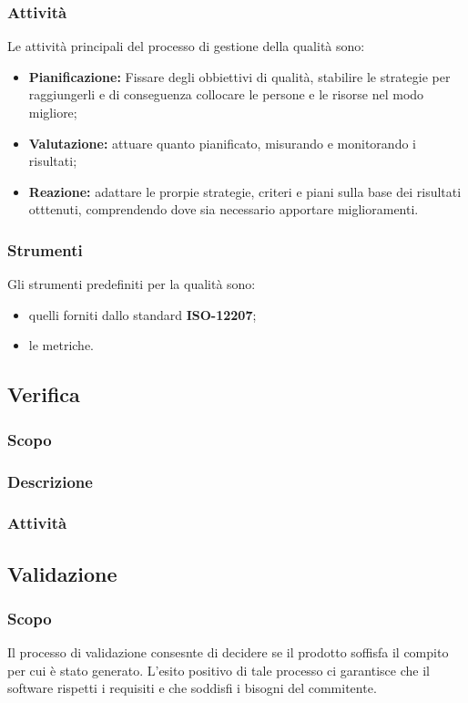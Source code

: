         \subsubsection{Attività}
        Le attività principali del processo di gestione della qualità sono:
        \begin{itemize}
            \item \textbf{Pianificazione: } Fissare degli obbiettivi di qualità, stabilire le strategie per raggiungerli e di conseguenza collocare le persone e le risorse nel modo migliore;
            \item \textbf{Valutazione: }attuare quanto pianificato, misurando e monitorando i risultati;
            \item \textbf{Reazione: } adattare le prorpie strategie, criteri e piani sulla base dei risultati otttenuti, comprendendo dove sia necessario apportare miglioramenti.
        \end{itemize}
        \subsubsection{Strumenti}
        Gli strumenti predefiniti per la qualità sono:
        \begin{itemize}
            \item quelli forniti dallo standard \textbf{ISO-12207};
            \item le metriche.
        \end{itemize}
    \subsection{Verifica}
        \subsubsection{Scopo}
        \subsubsection{Descrizione}
        \subsubsection{Attività}
    \subsection{Validazione}
        \subsubsection{Scopo}
        Il processo di validazione consesnte di decidere se il prodotto soffisfa il compito per cui è stato generato. L'esito positivo di tale processo ci garantisce che il software rispetti i requisiti e che soddisfi i bisogni del commitente.
